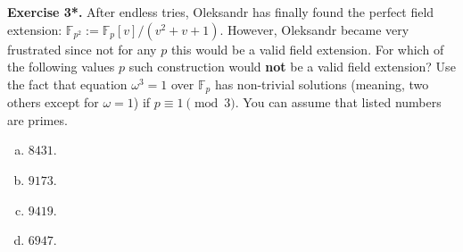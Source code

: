 \documentclass[../lecture-notes.tex]{subfiles}
\begin{document}
\textbf{Exercise 3*.} After endless tries, Oleksandr has finally found the perfect field extension: $\mathbb{F}_{p^2} := \mathbb{F}_p[v] / (v^2+v+1)$. However, Oleksandr became very frustrated since not for any $p$ this would be a valid field extension. For which of the following values $p$ such construction would \textbf{not} be a valid field extension? Use the fact that equation $\omega^3=1$ over $\mathbb{F}_p$ has non-trivial solutions (meaning, two others except for $\omega=1$) if $p \equiv 1 \pmod{3}$. You can assume that listed numbers are primes.
\begin{enumerate}[a)]
    \item $8431$.
    \item $9173$.
    \item $9419$.
    \item $6947$.
\end{enumerate}
\end{document}

